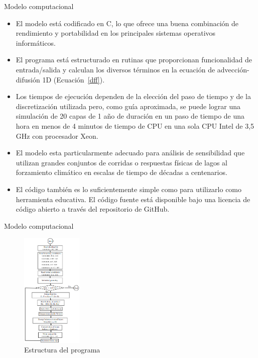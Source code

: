 \documentclass[
10pt,
aspectratio=169,
]{beamer}
\begin{document}
\begin{frame}{Modelo computacional}
\begin{itemize}
\item El modelo está codificado en C, lo que ofrece una buena combinación de rendimiento y portabilidad en los principales sistemas operativos informáticos. 
\item El programa está estructurado en rutinas que proporcionan funcionalidad de entrada/salida y calculan los diversos términos en la ecuación de advección-difusión 1D (Ecuación~\ref{dff}). 
\item Los tiempos de ejecución dependen de la elección del paso de tiempo y de la discretización utilizada pero, como guía aproximada, se puede lograr una simulación de 20 capas de 1 año de duración en un paso de tiempo de una hora en menos de 4 minutos de tiempo de CPU en una sola CPU Intel de 3,5 GHz con  procesador Xeon. 
\item El modelo esta particularmente adecuado para análisis de sensibilidad que utilizan grandes conjuntos de corridas o respuestas físicas de lagos al forzamiento climático en escalas de tiempo de décadas a centenarios. 
\item El código también es lo suficientemente simple como para utilizarlo como herramienta educativa. El código fuente está disponible bajo una licencia de código abierto a través del repositorio de GitHub.
\end{itemize}
\end{frame}


\begin{frame}{Modelo computacional}
\vspace{-0.5cm}
\begin{figure}[!htbp]
  \begin{center}
    \includegraphics[width=0.26\textwidth]{uclakeFlow1.png}
    \caption{Estructura del programa}
    \label{uclakeFlow1}
  \end{center}
\end{figure}
\end{frame}
\end{document}
